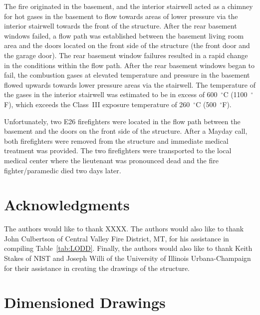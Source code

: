 \documentclass[12pt,oneside]{book}
\begin{document}
The fire originated in the basement, and the interior stairwell acted as a chimney for hot gases in the basement to flow towards areas of lower pressure via the interior stairwell towards the front of the structure. After the rear basement windows failed, a flow path was established between the basement living room area and the doors located on the front side of the structure (the front door and the garage door). The rear basement window failures resulted in a rapid change in the conditions within the flow path. After the rear basement windows began to fail, the combustion gases at elevated temperature and pressure in the basement flowed upwards towards lower pressure areas via the stairwell. The temperature of the gases in the interior stairwell was estimated to be in excess of 600~$^{\circ}$C (1100~$^{\circ}$F), which exceeds the Class~III exposure temperature of 260~$^{\circ}$C (500~$^{\circ}$F).

Unfortunately, two E26 firefighters were located in the flow path between the basement and the doors on the front side of the structure. After a Mayday call, both firefighters were removed from the structure and immediate medical treatment was provided. The two firefighters were transported to the local medical center where the lieutenant was pronounced dead and the fire fighter/paramedic died two days later.


\chapter*{Acknowledgments}

The authors would like to thank XXXX. The authors would also like to thank John Culbertson of Central Valley Fire District, MT, for his assistance in compiling Table~\ref{tab:LODD}. Finally, the authors would also like to thank Keith Stakes of NIST and Joseph Willi of the University of Illinois Urbana-Champaign for their assistance in creating the drawings of the structure.



\appendix

\chapter{Dimensioned Drawings}
\label{sec:drawings}
\end{document}
